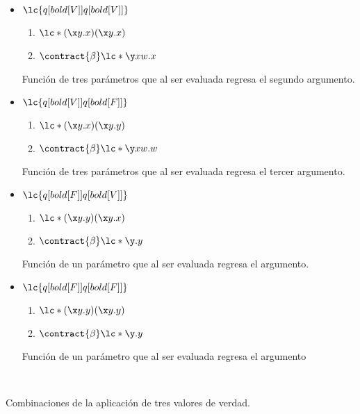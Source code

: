 \begin{itemize}
\item \(\lc{q[bold[V]] q[bold[V]]}\)
  \begin{enumerate}
  \item \(\lc*{(\x y.x)(\x y.x)}\)
  \item \(\contract{\beta} \lc*{\y x w.x}\)
  \end{enumerate}
  Función de tres parámetros que al ser evaluada regresa el segundo argumento.
\item \(\lc{q[bold[V]] q[bold[F]]}\)
  \begin{enumerate}
  \item \(\lc*{(\x y.x)(\x y.y)}\)
  \item \(\contract{\beta} \lc*{\y x w.w}\)
  \end{enumerate}
  Función de tres parámetros que al ser evaluada regresa el tercer argumento.
\item \(\lc{q[bold[F]] q[bold[V]]}\)
  \begin{enumerate}
  \item \(\lc*{(\x y.y)(\x y.x)}\)
  \item \(\contract{\beta} \lc*{\y.y}\)
  \end{enumerate}
  Función de un parámetro que al ser evaluada regresa el argumento.
\item \(\lc{q[bold[F]] q[bold[F]]}\)
  \begin{enumerate}
  \item \(\lc*{(\x y.y)(\x y.y)}\)
  \item \(\contract{\beta} \lc*{\y.y}\)
  \end{enumerate}
  Función de un parámetro que al ser evaluada regresa el argumento
\end{itemize} \

Combinaciones de la aplicación de tres valores de verdad. \\

